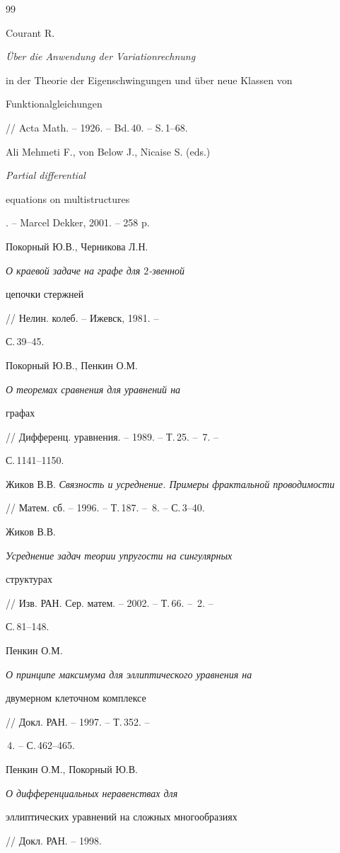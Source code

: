 \begin{thebibliography}{99} 




Courant R. {\em \"Uber die Anwendung der Variationrechnung 


in der Theorie der Eigenschwingungen und \"uber neue Klassen von 


Funktionalgleichungen} // Acta Math. -- 1926. -- Bd.\,40. -- S.\,1--68. 




Ali Mehmeti F., von Below J., Nicaise S. (eds.) {\em Partial differential 


equations on multistructures}. -- Marcel Dekker, 2001. -- 258 p. 




Покорный Ю.В., Черникова Л.Н. {\em О краевой задаче на графе для $2$-звенной 


цепочки стержней} // Нелин. колеб. -- Ижевск, 1981. -- 


С.\,39--45. 




Покорный Ю.В., Пенкин О.М. {\em О теоремах сравнения для уравнений на 


графах} // Дифференц. уравнения. -- 1989. -- Т.\,25. -- \No\,7. -- 


С.\,1141--1150. 




Жиков В.В. {\em Связность и усреднение. Примеры фрактальной проводимости} 


// Матем. сб. -- 1996. -- Т.\,187. -- \No\,8. -- С.\,3--40. 




Жиков В.В. {\em Усреднение задач теории упругости на сингулярных 


структурах} // Изв. РАН. Сер. матем. -- 2002. -- Т.\,66. -- \No\,2. -- 


С.\,81--148. 




Пенкин О.М. {\em О принципе максимума для эллиптического уравнения на 


двумерном клеточном комплексе} // Докл. РАН. -- 1997. -- Т.\,352. -- 


\No\,4. -- С.\,462--465. 




Пенкин О.М., Покорный Ю.В. {\em О дифференциальных неравенствах для 


эллиптических уравнений на сложных многообразиях} // Докл. РАН. -- 1998. 



\end{thebibliography}
